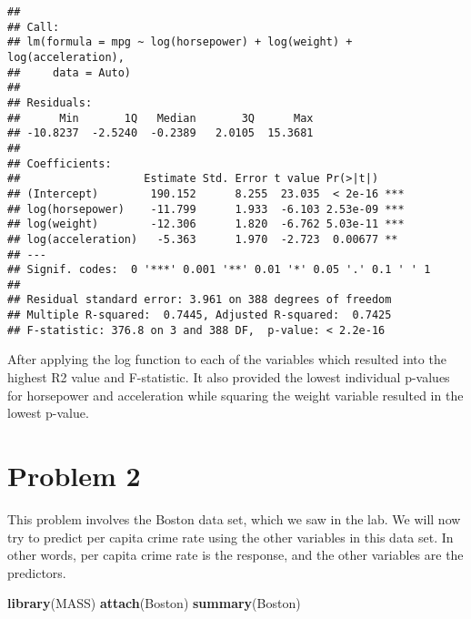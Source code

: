 \documentclass[]{article}
\newenvironment{Shaded}{\begin{snugshade}}{\end{snugshade}}
\newcommand{\KeywordTok}[1]{\textcolor[rgb]{0.13,0.29,0.53}{\textbf{#1}}}
\newcommand{\NormalTok}[1]{#1}
\begin{document}
\begin{verbatim}
## 
## Call:
## lm(formula = mpg ~ log(horsepower) + log(weight) + log(acceleration), 
##     data = Auto)
## 
## Residuals:
##      Min       1Q   Median       3Q      Max 
## -10.8237  -2.5240  -0.2389   2.0105  15.3681 
## 
## Coefficients:
##                   Estimate Std. Error t value Pr(>|t|)    
## (Intercept)        190.152      8.255  23.035  < 2e-16 ***
## log(horsepower)    -11.799      1.933  -6.103 2.53e-09 ***
## log(weight)        -12.306      1.820  -6.762 5.03e-11 ***
## log(acceleration)   -5.363      1.970  -2.723  0.00677 ** 
## ---
## Signif. codes:  0 '***' 0.001 '**' 0.01 '*' 0.05 '.' 0.1 ' ' 1
## 
## Residual standard error: 3.961 on 388 degrees of freedom
## Multiple R-squared:  0.7445, Adjusted R-squared:  0.7425 
## F-statistic: 376.8 on 3 and 388 DF,  p-value: < 2.2e-16
\end{verbatim}

After applying the log function to each of the variables which resulted
into the highest R2 value and F-statistic. It also provided the lowest
individual p-values for horsepower and acceleration while squaring the
weight variable resulted in the lowest p-value.

\section{Problem 2}\label{problem-2}

This problem involves the Boston data set, which we saw in the lab. We
will now try to predict per capita crime rate using the other variables
in this data set. In other words, per capita crime rate is the response,
and the other variables are the predictors.

\begin{Shaded}
\begin{Highlighting}[]
\KeywordTok{library}\NormalTok{(MASS)}
\KeywordTok{attach}\NormalTok{(Boston)}
\KeywordTok{summary}\NormalTok{(Boston)}
\end{Highlighting}
\end{Shaded}
\end{document}
